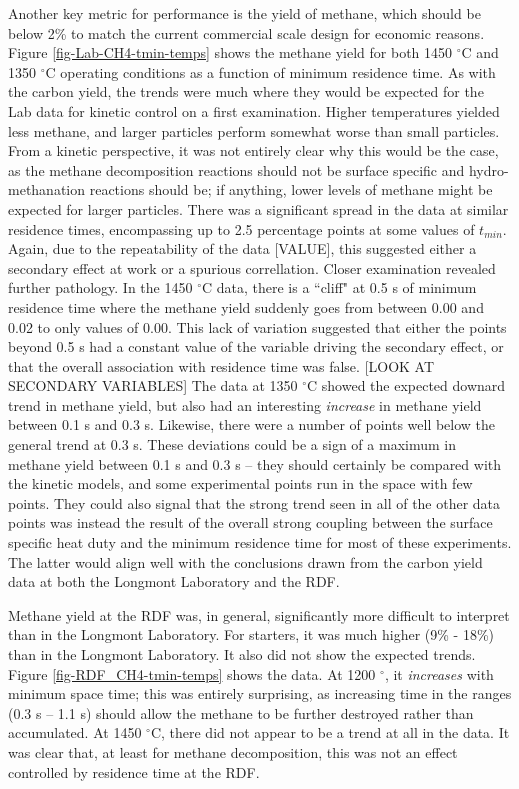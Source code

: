 \documentclass[11pt,twocolumn]{article}
\begin{document}
Another key metric for performance is the yield of methane, which should be below 2\% to match the current commercial scale design for economic reasons.  Figure \ref{fig-Lab-CH4-tmin-temps} shows the methane yield for both 1450 $^{\circ}$C and 1350 $^{\circ}$C operating conditions as a function of minimum residence time.  As with the carbon yield, the trends were much where they would be expected for the Lab data for kinetic control on a first examination.  Higher temperatures yielded less methane, and larger particles perform somewhat worse than small particles.  From a kinetic perspective, it was not entirely clear why this would be the case, as the methane decomposition reactions should not be surface specific and hydro-methanation reactions should be; if anything, lower levels of methane might be expected for larger particles.  There was a significant spread in the data at similar residence times, encompassing up to 2.5 percentage points at some values of $t_{min}$.  Again, due to the repeatability of the data [VALUE], this suggested either a secondary effect at work or a spurious correllation.  Closer examination revealed further pathology.  In the 1450 $^{\circ}$C data, there is a ``cliff" at 0.5 s of minimum residence time where the methane yield suddenly goes from between 0.00 and 0.02 to only values of 0.00.  This lack of variation suggested that either the points beyond 0.5 s had a constant value of the variable driving the secondary effect, or that the overall association with residence time was false. [LOOK AT SECONDARY VARIABLES]  The data at 1350 $^{\circ}$C showed the expected downard trend in methane yield, but also had an interesting \emph{increase} in methane yield between 0.1 s and 0.3 s.  Likewise, there were a number of points well below the general trend at 0.3 s.  These deviations could be a sign of a maximum in methane yield between 0.1 s and 0.3 s -- they should certainly be compared with the kinetic models, and some experimental points run in the space with few points.  They could also signal that the strong trend seen in all of the other data points was instead the result of the overall strong coupling between the surface specific heat duty and the minimum residence time for most of these experiments.  The latter would align well with the conclusions drawn from the carbon yield data at both the Longmont Laboratory and the RDF.

Methane yield at the RDF was, in general, significantly more difficult to interpret than in the Longmont Laboratory.  For starters, it was much higher (9\% - 18\%) than in the Longmont Laboratory.  It also did not show the expected trends.  Figure \ref{fig-RDF_CH4-tmin-temps} shows the data.  At 1200 $^{\circ}$, it \emph{increases} with minimum space time; this was entirely surprising, as increasing time in the ranges (0.3 s -- 1.1 s) should allow the methane to be further destroyed rather than accumulated.  At 1450 $^{\circ}$C, there did not appear to be a trend at all in the data.  It was clear that, at least for methane decomposition, this was not an effect controlled by residence time at the RDF.
\end{document}

